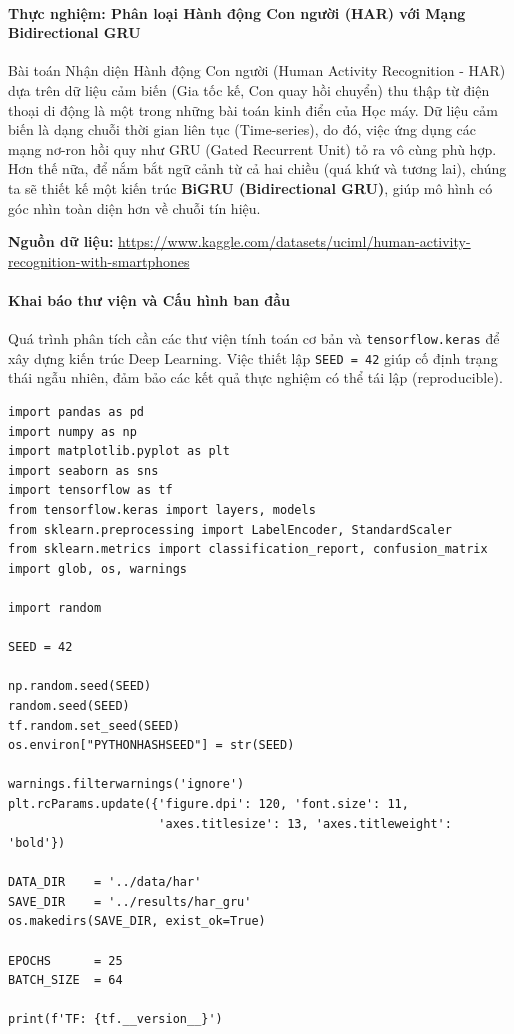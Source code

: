 \paragraph{Thực nghiệm: Phân loại Hành động Con người (HAR) với Mạng Bidirectional GRU} \hfill\mbox{}

Bài toán Nhận diện Hành động Con người (Human Activity Recognition - HAR) dựa trên dữ liệu cảm biến (Gia tốc kế, Con quay hồi chuyển) thu thập từ điện thoại di động là một trong những bài toán kinh điển của Học máy. Dữ liệu cảm biến là dạng chuỗi thời gian liên tục (Time-series), do đó, việc ứng dụng các mạng nơ-ron hồi quy như GRU (Gated Recurrent Unit) tỏ ra vô cùng phù hợp. Hơn thế nữa, để nắm bắt ngữ cảnh từ cả hai chiều (quá khứ và tương lai), chúng ta sẽ thiết kế một kiến trúc \textbf{BiGRU (Bidirectional GRU)}, giúp mô hình có góc nhìn toàn diện hơn về chuỗi tín hiệu.

\begin{center}
    \textbf{Nguồn dữ liệu:} \url{https://www.kaggle.com/datasets/uciml/human-activity-recognition-with-smartphones}
\end{center}

\paragraph{Khai báo thư viện và Cấu hình ban đầu} \hfill\mbox{}

Quá trình phân tích cần các thư viện tính toán cơ bản và \texttt{tensorflow.keras} để xây dựng kiến trúc Deep Learning. Việc thiết lập \texttt{SEED = 42} giúp cố định trạng thái ngẫu nhiên, đảm bảo các kết quả thực nghiệm có thể tái lập (reproducible).

\begin{lstlisting}[style=pythoncode, caption={Khai báo thư viện và thiết lập môi trường}]
import pandas as pd
import numpy as np
import matplotlib.pyplot as plt
import seaborn as sns
import tensorflow as tf
from tensorflow.keras import layers, models
from sklearn.preprocessing import LabelEncoder, StandardScaler
from sklearn.metrics import classification_report, confusion_matrix
import glob, os, warnings

import random

SEED = 42

np.random.seed(SEED)
random.seed(SEED)
tf.random.set_seed(SEED)
os.environ["PYTHONHASHSEED"] = str(SEED)

warnings.filterwarnings('ignore')
plt.rcParams.update({'figure.dpi': 120, 'font.size': 11,
                     'axes.titlesize': 13, 'axes.titleweight': 'bold'})

DATA_DIR    = '../data/har'
SAVE_DIR    = '../results/har_gru'
os.makedirs(SAVE_DIR, exist_ok=True)

EPOCHS      = 25
BATCH_SIZE  = 64

print(f'TF: {tf.__version__}')
\end{lstlisting}

